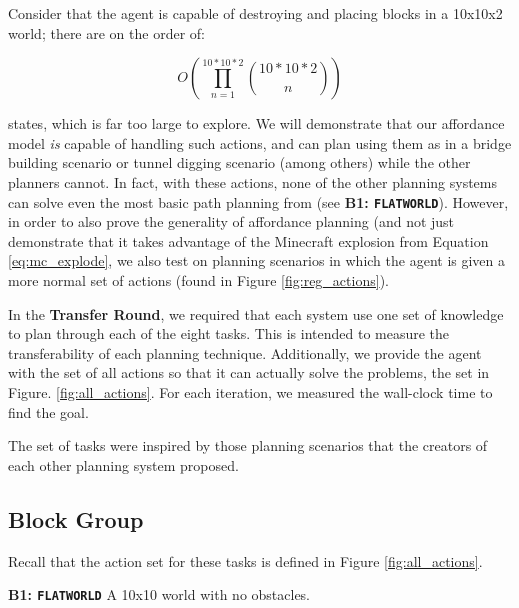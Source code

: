 \documentclass[]{article}
\begin{document}
Consider that the agent is capable of destroying and placing blocks in a 10x10x2 world; there are on the order of:

\begin{equation}
O\left(\prod_{n=1}^{10*10*2} \binom{10*10*2}{n}\right)
\label{eq:mc_explode}
\end{equation}

states, which is far too large to explore. We will demonstrate that our affordance model {\it is} capable of handling such actions, and can plan using them as in a bridge building scenario or tunnel digging scenario (among others) while the other planners cannot. In fact, with these actions, none of the other planning systems can solve even the most basic path planning from (see {\bf B1: \texttt{FLATWORLD}}). However, in order to also prove the generality of affordance planning (and not just demonstrate that it takes advantage of the Minecraft explosion from Equation \ref{eq:mc_explode}, we also test on planning scenarios in which the agent is given a more normal set of actions (found in Figure \ref{fig:reg_actions}).

In the {\bf Transfer Round}, we required that each system use one set of knowledge to plan through each of the eight tasks. This is intended to measure the transferability of each planning technique. Additionally, we provide the agent with the set of all actions so that it can actually solve the problems, the set in Figure. \ref{fig:all_actions}.
For each iteration, we measured the wall-clock time to find the goal.

The set of tasks were inspired by those planning scenarios that the creators of each other planning system proposed.
\subsection{Block Group}

Recall that the action set for these tasks is defined in Figure \ref{fig:all_actions}.

{\bf B1: \texttt{FLATWORLD}} A 10x10 world with no obstacles.
\end{document}

